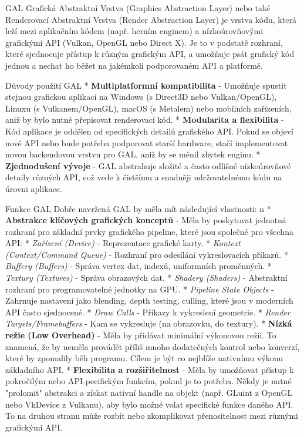 \chap GAL
Grafická Abstraktní Vrstva (Graphics Abstraction Layer) nebo také Renderovací Abstraktní Vrstva (Render Abstraction Layer) je vrstva kódu, která leží mezi aplikačním kódem (např. herním enginem) a nízkoúrovňovými grafickými API (Vulkan, OpenGL nebo Direct X). Je to v podstatě rozhraní, které sjednocuje přístup k různým grafickým API, a umožňuje psát grafický kód jednou a nechat ho běžet na jakémkoli podporovaném API a platformě.

\sec Důvody použití GAL
\begitems
* {\bf Multiplatformní kompatibilita} - Umožňuje spustit stejnou grafickou aplikaci na Windows (s Direct3D nebo Vulkan/OpenGL), Linuxu (s Vulkanem/OpenGL), macOS (s Metalem) nebo mobilních zařízeních, aniž by bylo nutné přepisovat renderovací kód.
* {\bf Modularita a flexibilita} - Kód aplikace je oddělen od specifických detailů grafického API. Pokud se objeví nové API nebo bude potřeba podporovat starší hardware, stačí implementovat novou backendovou vrstvu pro GAL, aniž by se měnil zbytek enginu.
* {\bf Zjednodušení vývoje} -  GAL abstrahuje složité a často odlišné nízkoúrovňové detaily různých API, což vede k čistšímu a snadněji udržovatelnému kódu na úrovni aplikace.
\enditems


\sec Funkce GAL
Dobře navržená GAL by měla mít následující vlastnosti:
\begitems \style n
* {\bf Abstrakce klíčových grafických konceptů} - Měla by poskytovat jednotná rozhraní pro základní prvky grafického pipeline, které jsou společné pro všechna API:
    \begitems
    * {\it Zařízení (Device)} - Reprezentace grafické karty.
    * {\it Kontext (Context/Command Queue)} - Rozhraní pro odesílání vykreslovacích příkazů.
    * {\it Buffery (Buffers)} - Správa vertex dat, indexů, uniformních proměnných.
    * {\it Textury (Textures)} - Správa obrazových dat.
    * {\it Shadery (Shaders)} - Abstraktní rozhraní pro programovatelné jednotky na GPU.
    * {\it Pipeline State Objects} - Zahrnuje nastavení jako blending, depth testing, culling, které jsou v moderních API často sjednocené.
    * {\it Draw Calls} -  Příkazy k vykreslení geometrie.
    * {\it Render Targets/Framebuffers} - Kam se vykresluje (na obrazovku, do textury).
    \enditems
* {\bf Nízká režie (Low Overhead)} - Měla by přidávat minimální výkonovou režii. To znamená, že by neměla provádět příliš mnoho dodatečných kontrol nebo konverzí, které by zpomalily běh programu. Cílem je být co nejblíže nativnímu výkonu základního API.
* {\bf Flexibilita a rozšiřitelnost} - Měla by umožňovat přístup k pokročilým nebo API-pecifickým funkcím, pokud je to potřeba. Někdy je nutné "prolomit" abstrakci a získat nativní handle na objekt (např. GLuint z OpenGL nebo VkDevice z Vulkanu), aby bylo možné volat specifické funkce daného API. To na druhou stranu může rozbít nebo zkomplikovat přenositelnost mezi různými grafickými API.
\enditems


